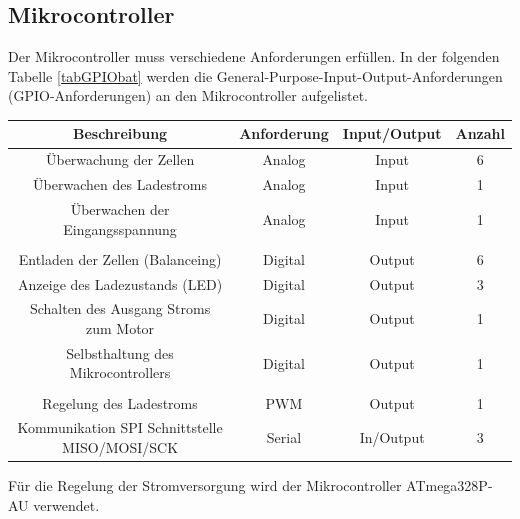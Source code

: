 \subsection*{Mikrocontroller}
Der Mikrocontroller muss verschiedene Anforderungen erfüllen.
In der folgenden Tabelle \ref{tabGPIObat} werden die General-Purpose-Input-Output-Anforderungen (GPIO-Anforderungen) an den Mikrocontroller aufgelistet.
\begin{center}
	\begin{tabular}{|c|c|c|c|}
		\hline 
		Beschreibung & Anforderung & Input/Output & Anzahl \\ 
		\hline 
		Überwachung der Zellen & Analog & Input & 6 \\ 
		\hline 
		Überwachen des Ladestroms &	Analog & Input & 1 \\ 
		\hline 
		Überwachen der Eingangsspannung & Analog & Input & 1 \\ 
		\hline 
		&  &  &  \\ 
		\hline 
		Entladen der Zellen (Balanceing) & Digital  & Output & 6 \\ 
		\hline 
		Anzeige des Ladezustands (LED) & Digital & Output & 3 \\ 
		\hline 
		Schalten des Ausgang Stroms zum Motor & Digital & Output & 1 \\ 
		\hline 
		Selbsthaltung des Mikrocontrollers & Digital & Output & 1 \\ 
		\hline 
		&  &  &  \\ 
		\hline 
		Regelung des Ladestroms & PWM & Output & 1 \\ 
		\hline 
		Kommunikation SPI Schnittstelle MISO/MOSI/SCK & Serial & In/Output & 3 \\ 
		\hline 
	\end{tabular} 
	\label{tabGPIObat}
\end{center}
Für die Regelung der Stromversorgung wird der Mikrocontroller ATmega328P-AU verwendet.
